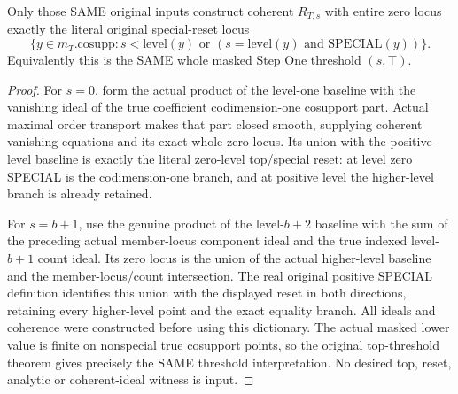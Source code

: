 \begin{theorem}
\label{hir:original-step-one-special-reset-entire-coherent-defining-ideal}
\leanok
{}
Only those SAME original inputs construct coherent $R_{T,s}$ with entire zero
locus exactly the literal original special-reset locus
\[
 \{y\in m_T.\mathrm{cosupp}:s<\mathrm{level}(y)
       \text{ or }(s=\mathrm{level}(y)\text{ and SPECIAL}(y))\}.
\]
Equivalently this is the SAME whole masked Step One threshold $(s,\top)$.
\end{theorem}
\begin{proof}
For $s=0$, form the actual product of the level-one baseline with the vanishing
ideal of the true coefficient codimension-one cosupport part. Actual maximal
order transport makes that part closed smooth, supplying coherent vanishing
equations and its exact whole zero locus. Its union with the positive-level
baseline is exactly the literal zero-level top/special reset: at level zero
SPECIAL is the codimension-one branch, and at positive level the higher-level
branch is already retained.

For $s=b+1$, use the genuine product of the level-$b+2$ baseline with the sum
of the preceding actual member-locus component ideal and the true indexed
level-$b+1$ count ideal. Its zero locus is the union of the actual higher-level
baseline and the member-locus/count intersection. The real original positive
SPECIAL definition identifies this union with the displayed reset in both
directions, retaining every higher-level point and the exact equality branch.
All ideals and coherence were constructed before using this dictionary.
The actual masked lower value is finite on nonspecial true cosupport points,
so the original top-threshold theorem gives precisely the SAME threshold
interpretation. No desired top, reset, analytic or coherent-ideal witness is input.
\end{proof}


